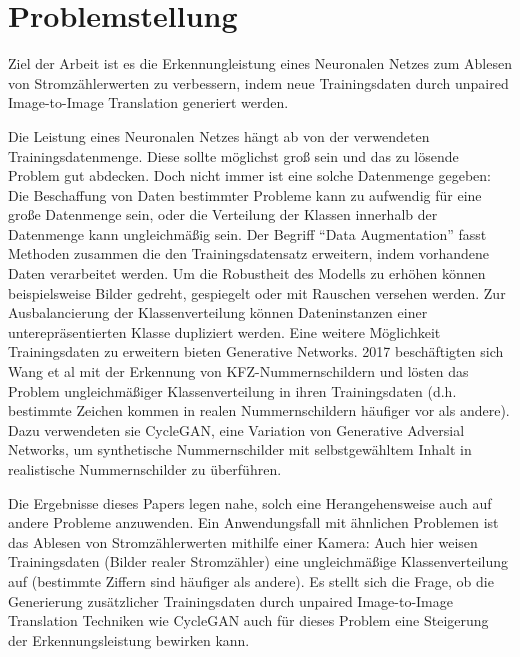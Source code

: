 \chapter*{Problemstellung}
Ziel der Arbeit ist es die Erkennungleistung eines Neuronalen Netzes zum Ablesen von Stromzählerwerten zu verbessern, indem
neue Trainingsdaten durch unpaired Image-to-Image Translation generiert werden.

Die Leistung eines Neuronalen Netzes hängt ab von der verwendeten Trainingsdatenmenge. Diese sollte möglichst groß sein und das zu lösende Problem gut abdecken.
Doch nicht immer ist eine solche Datenmenge gegeben: Die Beschaffung von Daten bestimmter Probleme kann zu aufwendig für eine große Datenmenge sein,
oder die Verteilung der Klassen innerhalb der Datenmenge kann ungleichmäßig sein.
Der Begriff "`Data Augmentation"' fasst Methoden zusammen die den Trainingsdatensatz erweitern, indem vorhandene Daten verarbeitet werden.
Um die Robustheit des Modells zu erhöhen können beispielsweise Bilder gedreht, gespiegelt oder mit Rauschen versehen werden.
Zur Ausbalancierung der Klassenverteilung können Dateninstanzen einer unterepräsentierten Klasse dupliziert werden.
Eine weitere Möglichkeit Trainingsdaten zu erweitern bieten Generative Networks.
2017 beschäftigten sich Wang et al\cite{lplate} mit der Erkennung von KFZ-Nummernschildern und lösten das Problem ungleichmäßiger Klassenverteilung in ihren Trainingsdaten
(d.h. bestimmte Zeichen kommen in realen Nummernschildern häufiger vor als andere). Dazu verwendeten sie CycleGAN\cite{cyclegan}, eine Variation von Generative Adversial Networks,
um synthetische Nummernschilder mit selbstgewähltem Inhalt in realistische Nummernschilder zu überführen.

Die Ergebnisse dieses Papers legen nahe, solch eine Herangehensweise auch auf andere Probleme anzuwenden.
Ein Anwendungsfall mit ähnlichen Problemen ist das Ablesen von Stromzählerwerten mithilfe einer Kamera: Auch hier weisen Trainingsdaten (Bilder realer Stromzähler)
eine ungleichmäßige Klassenverteilung auf (bestimmte Ziffern sind häufiger als andere).
Es stellt sich die Frage, ob die Generierung zusätzlicher Trainingsdaten durch unpaired Image-to-Image Translation Techniken wie CycleGAN auch für dieses Problem 
eine Steigerung der Erkennungsleistung bewirken kann.